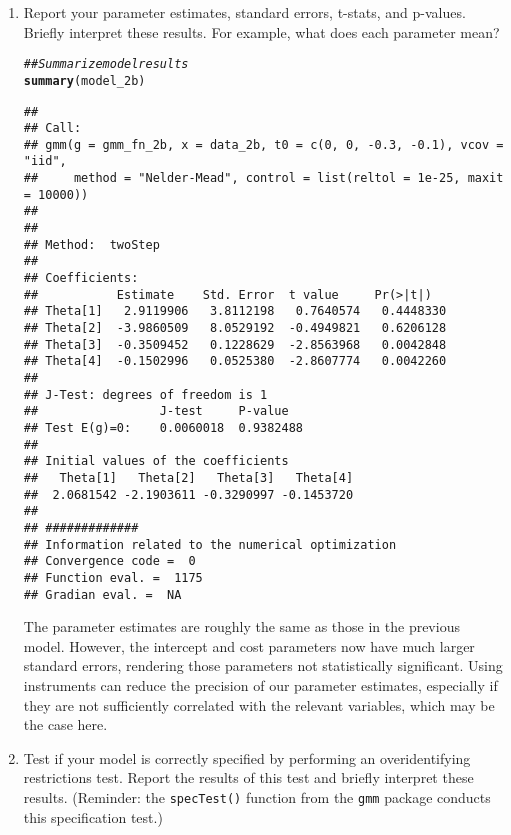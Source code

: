 \documentclass[11pt,letterpaper]{article}\usepackage[]{graphicx}\usepackage[]{color}
\makeatletter
\newcommand{\hlcom}[1]{\textcolor[rgb]{0.678,0.584,0.686}{\textit{#1}}}%
\newcommand{\hlstd}[1]{\textcolor[rgb]{0.345,0.345,0.345}{#1}}%
\newcommand{\hlkwd}[1]{\textcolor[rgb]{0.737,0.353,0.396}{\textbf{#1}}}%
\newenvironment{kframe}{%
 \def\at@end@of@kframe{}%
 \ifinner\ifhmode%
  \def\at@end@of@kframe{\end{minipage}}%
  \begin{minipage}{\columnwidth}%
 \fi\fi%
 \def\FrameCommand##1{\hskip\@totalleftmargin \hskip-\fboxsep
 \colorbox{shadecolor}{##1}\hskip-\fboxsep
     \hskip-\linewidth \hskip-\@totalleftmargin \hskip\columnwidth}%
 \MakeFramed {\advance\hsize-\width
   \@totalleftmargin\z@ \linewidth\hsize
   \@setminipage}}%
 {\par\unskip\endMakeFramed%
 \at@end@of@kframe}
\newenvironment{knitrout}{}{} %
\makeatother
\begin{document}
\begin{enumerate}[label=\alph*., leftmargin=*]
	\begin{enumerate}[label=\roman*.]
		\item Report your parameter estimates, standard errors, t-stats, and p-values. Briefly interpret these results. For example, what does each parameter mean?

\begin{knitrout}
\color{fgcolor}\begin{kframe}
\begin{alltt}
\hlcom{## Summarize model results}
\hlkwd{summary}\hlstd{(model_2b)}
\end{alltt}
\begin{verbatim}
## 
## Call:
## gmm(g = gmm_fn_2b, x = data_2b, t0 = c(0, 0, -0.3, -0.1), vcov = "iid", 
##     method = "Nelder-Mead", control = list(reltol = 1e-25, maxit = 10000))
## 
## 
## Method:  twoStep 
## 
## Coefficients:
##           Estimate    Std. Error  t value     Pr(>|t|)  
## Theta[1]   2.9119906   3.8112198   0.7640574   0.4448330
## Theta[2]  -3.9860509   8.0529192  -0.4949821   0.6206128
## Theta[3]  -0.3509452   0.1228629  -2.8563968   0.0042848
## Theta[4]  -0.1502996   0.0525380  -2.8607774   0.0042260
## 
## J-Test: degrees of freedom is 1 
##                 J-test     P-value  
## Test E(g)=0:    0.0060018  0.9382488
## 
## Initial values of the coefficients
##   Theta[1]   Theta[2]   Theta[3]   Theta[4] 
##  2.0681542 -2.1903611 -0.3290997 -0.1453720 
## 
## #############
## Information related to the numerical optimization
## Convergence code =  0 
## Function eval. =  1175 
## Gradian eval. =  NA
\end{verbatim}
\end{kframe}
\end{knitrout}

		The parameter estimates are roughly the same as those in the previous model. However, the intercept and cost parameters now have much larger standard errors, rendering those parameters not statistically significant. Using instruments can reduce the precision of our parameter estimates, especially if they are not sufficiently correlated with the relevant variables, which may be the case here.

		\item Test if your model is correctly specified by performing an overidentifying restrictions test. Report the results of this test and briefly interpret these results. (Reminder: the \texttt{specTest()} function from the \texttt{gmm} package conducts this specification test.)


\end{enumerate}
\end{enumerate}
\end{document}
